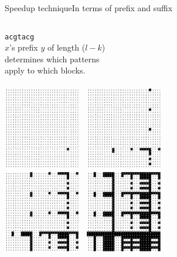 \documentclass[pdf,xcolor={dvipsnames}]{beamer}
\begin{document}
	\begin{frame}{Speedup technique}{In terms of prefix and suffix}
		\begin{columns}[t]
			\begin{column}{0.5\textwidth}
			\centering
			\texttt{\color{blue}\Huge acgtacg}\\
			$x$'s {\color{blue}prefix $y$} of length ($l-k$)\\
			determines which patterns\\
			apply to which blocks.\\\ \\

			\includegraphics[width=0.25\textwidth]{img/0.png}\ \ \includegraphics[width=0.25\textwidth]{img/1.png}\\
			\includegraphics[width=0.25\textwidth]{img/2.png}\ \ \includegraphics[width=0.25\textwidth]{img/3.png}\\

\end{column}
\end{columns}
\end{frame}
\end{document}
